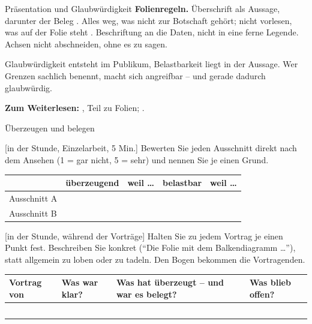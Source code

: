 \begin{handout}{Präsentation und Glaubwürdigkeit}
\textbf{Folienregeln.} Überschrift als Aussage, darunter der Beleg
\parencite{alley2013craft}. Alles weg, was nicht zur Botschaft gehört;
nicht vorlesen, was auf der Folie steht \parencite{mayer2009multimedia}.
Beschriftung an die Daten, nicht in eine ferne Legende. Achsen nicht
abschneiden, ohne es zu sagen.

\begin{merkbox}
Glaubwürdigkeit entsteht im Publikum, Belastbarkeit liegt in der Aussage.
Wer Grenzen sachlich benennt, macht sich angreifbar -- und gerade dadurch
glaubwürdig.
\end{merkbox}

\textbf{Zum Weiterlesen:} \textcite{alley2013craft}, Teil zu Folien;
\textcite{henrich2009}.
\end{handout}

\begin{uebungsblatt}{Überzeugen und belegen}

[in der Stunde, Einzelarbeit, 5 Min.]
Bewerten Sie jeden Ausschnitt direkt nach dem Ansehen (1 = gar nicht,
5 = sehr) und nennen Sie je einen Grund.

\begin{center}
\renewcommand{\arraystretch}{2.0}
\begin{tabular}{|p{}|p{}|p{}|p{}|p{}|}
\hline
 & \textbf{überzeugend} & \textbf{weil \ldots} & \textbf{belastbar} & \textbf{weil \ldots} \\
\hline
Ausschnitt A & & & & \\ \hline
Ausschnitt B & & & & \\ \hline
\end{tabular}
\end{center}

[in der Stunde, während der Vorträge]
Halten Sie zu jedem Vortrag je einen Punkt fest. Beschreiben Sie konkret
(\enquote{Die Folie mit dem Balkendiagramm \ldots}), statt allgemein zu
loben oder zu tadeln. Den Bogen bekommen die Vortragenden.

\begin{center}\small
\renewcommand{\arraystretch}{3.2}
\begin{tabular}{|p{}|p{}|p{}|p{}|}
\hline
\textbf{Vortrag von} & \textbf{Was war klar?} & \textbf{Was hat überzeugt -- und war es belegt?} & \textbf{Was blieb offen?} \\
\hline
 & & & \\ \hline
 & & & \\ \hline
 & & & \\ \hline
 & & & \\ \hline
 & & & \\ \hline
\end{tabular}
\end{center}

\end{uebungsblatt}

